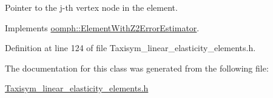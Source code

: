 Pointer to the j-\/th vertex node in the element. 



Implements \hyperlink{classoomph_1_1ElementWithZ2ErrorEstimator_a0eedccc33519f852c5dc2055ddf2774b}{oomph\+::\+Element\+With\+Z2\+Error\+Estimator}.



Definition at line 124 of file Taxisym\+\_\+linear\+\_\+elasticity\+\_\+elements.\+h.



The documentation for this class was generated from the following file\+:\begin{DoxyCompactItemize}
\item 
\hyperlink{Taxisym__linear__elasticity__elements_8h}{Taxisym\+\_\+linear\+\_\+elasticity\+\_\+elements.\+h}\end{DoxyCompactItemize}

